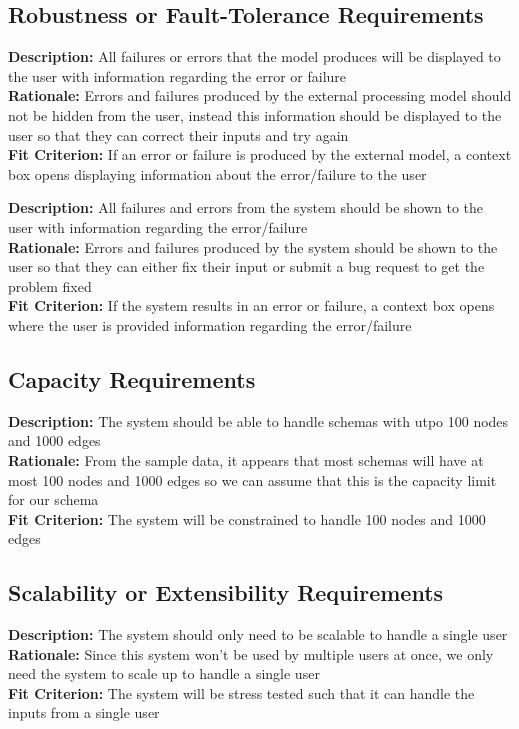 \documentclass[12pt]{article}
\begin{document}
\subsection{Robustness or Fault-Tolerance Requirements}
\begin{tcolorbox}[title=PRF1]
  \textbf{Description:} All failures or errors that the model produces will be displayed to the user with information regarding the error or failure \\
  \textbf{Rationale:} Errors and failures produced by the external processing model should not be hidden from the user, instead this information should be displayed to the user so that they can correct their inputs and try again \\
  \textbf{Fit Criterion:} If an error or failure is produced by the external model, a context box opens displaying information about the error/failure to the user
\end{tcolorbox}
\begin{tcolorbox}[title=PRF2]
  \textbf{Description:} All failures and errors from the system should be shown to the user with information regarding the error/failure \\
  \textbf{Rationale:} Errors and failures produced by the system should be shown to the user so that they can either fix their input or submit a bug request to get the problem fixed \\
  \textbf{Fit Criterion:} If the system results in an error or failure, a context box opens where the user is provided information regarding the error/failure
\end{tcolorbox}
\subsection{Capacity Requirements}
\begin{tcolorbox}[title=PC1]
  \textbf{Description:} The system should be able to handle schemas with utpo 100 nodes and 1000 edges \\
  \textbf{Rationale:} From the sample data, it appears that most schemas will have at most 100 nodes and 1000 edges so we can assume that this is the capacity limit for our schema \\
  \textbf{Fit Criterion:} The system will be constrained to handle 100 nodes and 1000 edges
\end{tcolorbox}
\subsection{Scalability or Extensibility Requirements}
\begin{tcolorbox}[title=PSE1]
  \textbf{Description:} The system should only need to be scalable to handle a single user \\
  \textbf{Rationale:} Since this system won't be used by multiple users at once, we only need the system to scale up to handle a single user \\
  \textbf{Fit Criterion:} The system will be stress tested such that it can handle the inputs from a single user
\end{tcolorbox}
\end{document}
